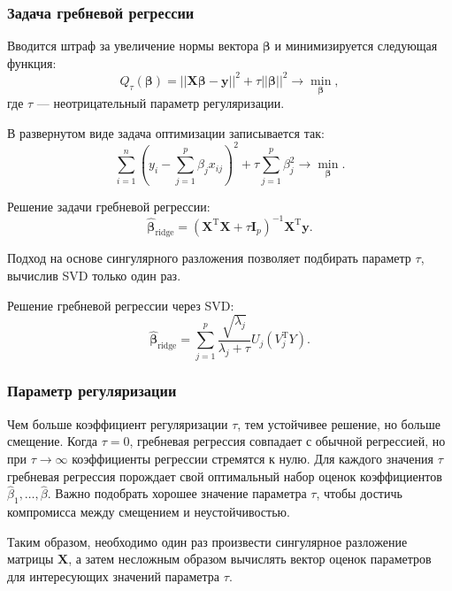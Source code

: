 \documentclass[12pt,a4paper,final]{article}
\DeclareMathOperator{\T}{T}
\newcommand{\1}{\mathds{1}}
\begin{document}
\subsubsection{Задача гребневой регрессии}
Вводится штраф за увеличение нормы вектора $\bm \beta$ и минимизируется следующая функция:
\begin{equation*}
	Q_{\tau}(\bm \beta)
	=
	||\bm{X} \bm \beta-\bm y||^{2}
	+
	\tau||\bm \beta||^{2}
	\rightarrow\min_{\bm \beta},
\end{equation*}
где $\tau$ --- неотрицательный параметр регуляризации.

В развернутом виде задача оптимизации записывается так:
\begin{equation*}
	\sum_{i=1}^{n}
	\left(
	y_{i}
	-
	\sum_{j=1}^{p}\beta_{j}x_{ij}
	\right)^{2}
	+
	\tau\sum_{j=1}^{p}\beta_{j}^{2}
	\rightarrow\min_{\bm \beta}.
\end{equation*}

Решение задачи гребневой регрессии:
\begin{equation*}
	\hat{\bm \beta}_{\text{ridge}}
	=
	(\bm{X}^{\mathrm{T}}\bm{X}+\tau\bm{I}_{p})^{-1}\bm{X}^{\mathrm{T}} \bm y.
\end{equation*}



Подход на основе сингулярного разложения позволяет подбирать параметр $\tau$, вычислив SVD только один раз.

Решение гребневой регрессии через SVD:
\begin{equation*}
	\hat{\bm \beta}_{\text{ridge}}
	= \sum_{j=1}^p \frac{\sqrt{\lambda_j}}{\lambda_j + \tau} U_j(V_j^{\T}Y).
\end{equation*}


\subsubsection{Параметр регуляризации}
Чем больше коэффициент регуляризации $\tau$, тем устойчивее решение, но больше смещение. 
Когда $\tau = 0$, гребневая регрессия совпадает с обычной регрессией, но при $\tau \rightarrow \infty$ коэффициенты регрессии стремятся к нулю.
Для каждого значения $\tau$ гребневая регрессия порождает свой оптимальный набор оценок коэффициентов $\hat\beta_{1},\ldots,\hat\beta$.
Важно подобрать хорошее значение параметра $\tau$, чтобы достичь компромисса между смещением и неустойчивостью. 

Таким образом, необходимо один раз произвести сингулярное разложение матрицы $\bm {X}$, а затем несложным образом вычислять вектор оценок параметров для интересующих значений параметра $\tau$. 
\end{document}
